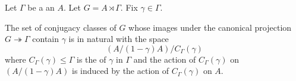 \begin{proposition} \label{proposition:conj_classes_in_a_semidirect_prod_of_ab_grp_by_grp_are_classified_by_orbits_by_centralizers_on_coinvariants}
    Let $\Gamma$ be a  an  $A$. Let $G = A \rtimes \Gamma$. Fix $\gamma \in \Gamma$. 
    
    The set of conjugacy classes of $G$ whose images under the canonical projection $G \twoheadrightarrow \Gamma$ contain $\gamma$ is in natural  with the  space
    $$(A/(1-\gamma) A) / C_\Gamma(\gamma)$$
    where $C_\Gamma(\gamma) \leq \Gamma$ is the  of $\gamma$ in $\Gamma$ and the action of $C_\Gamma(\gamma)$ on $(A/(1-\gamma) A)$ is induced by the action of $C_\Gamma(\gamma)$ on $A$.
\end{proposition}

